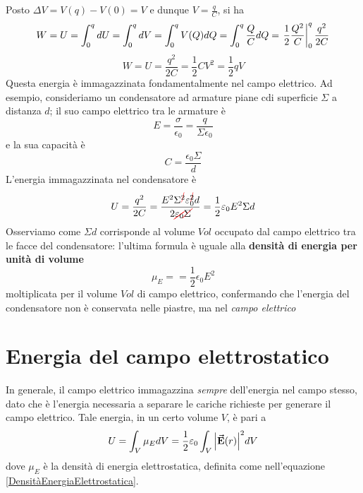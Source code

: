 Posto $\Delta V=V(q)-V(0)=V$ e dunque $V=\frac{q}{C}$, si ha
\begin{equation*}
	W=U=\int_{0}^{q}dU=\int_{0}^{q}dV=\int_0^{q}V(Q)dQ=\int_{0}^{q}\frac{Q}{C}dQ=\eval{\frac{1}{2}\frac{Q^2}{C}}_{0}^{q}\frac{q^2}{2C}
\end{equation*}
\begin{equation}
	W=U=\frac{q^2}{2C}=\frac{1}{2}CV^2=\frac{1}{2}qV
\end{equation}
Questa energia è immagazzinata fondamentalmente nel campo elettrico. Ad esempio, consideriamo un condensatore ad armature piane cdi superficie $\Sigma$ a distanza $d$; il suo campo elettrico tra le armature è
\begin{equation*}
	E=\frac{\sigma}{\epsilon_0}=\frac{q}{\Sigma \epsilon_0}
\end{equation*}
e la sua capacità è
\begin{equation*}
	C=\frac{\epsilon_0\Sigma}{d}
\end{equation*}
L'energia immagazzinata nel condensatore è
\begin{equation*}
	U=\frac{q^2}{2C}=\frac{E^2\Sigma^{\Ccancel[red]{2}}\epsilon_0^{\Ccancel[red]{2}} d}{2\Ccancel[red]{\epsilon_0}\Ccancel[red]{\Sigma}}=\frac{1}{2}\epsilon_0E^2\Sigma d
\end{equation*}
Osserviamo come $\Sigma d$ corrisponde al volume ${Vol}$ occupato dal campo elettrico tra le facce del condensatore: l'ultima formula è uguale alla \textbf{densità di energia per unità di volume}
\begin{equation}\label{DensitàEnergiaElettrostatica}
	\mu_{E}==\frac{1}{2}\epsilon_0E^2
\end{equation}
moltiplicata per il volume ${Vol}$ di campo elettrico, confermando che l'energia del condensatore non è conservata nelle piastre, ma nel \textit{campo elettrico}
\section{Energia del campo elettrostatico}
In generale, il campo elettrico immagazzina \textit{sempre} dell'energia nel campo stesso, dato che è l'energia necessaria a separare le cariche richieste per generare il campo elettrico. Tale energia, in un certo volume $V$, è pari a
\begin{equation}
	U=\int_V\mu_EdV=\frac{1}{2}\varepsilon_0\int_V\abs{\vb*{\va{E}}(r)}^2dV
\end{equation}
dove $\mu_E$ è la densità di energia elettrostatica, definita come nell'equazione \eqref{DensitàEnergiaElettrostatica}.

